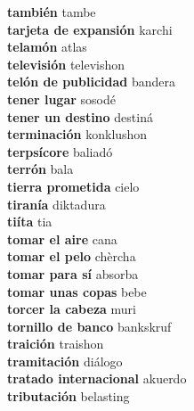 \textbf{ también  } tambe \\
\textbf{ tarjeta de expansión  } karchi \\
\textbf{ telamón  } atlas \\
\textbf{ televisión  } televishon \\
\textbf{ telón de publicidad  } bandera \\
\textbf{ tener lugar  } sosodé \\
\textbf{ tener un destino  } destiná \\
\textbf{ terminación  } konklushon \\
\textbf{ terpsícore  } baliadó \\
\textbf{ terrón  } bala \\
\textbf{ tierra prometida  } cielo \\
\textbf{ tiranía  } diktadura \\
\textbf{ tiíta  } tia \\
\textbf{ tomar el aire  } cana \\
\textbf{ tomar el pelo  } chèrcha \\
\textbf{ tomar para sí  } absorba \\
\textbf{ tomar unas copas  } bebe \\
\textbf{ torcer la cabeza  } muri \\
\textbf{ tornillo de banco  } bankskruf \\
\textbf{ traición  } traishon \\
\textbf{ tramitación  } diálogo \\
\textbf{ tratado internacional  } akuerdo \\
\textbf{ tributación  } belasting \\
